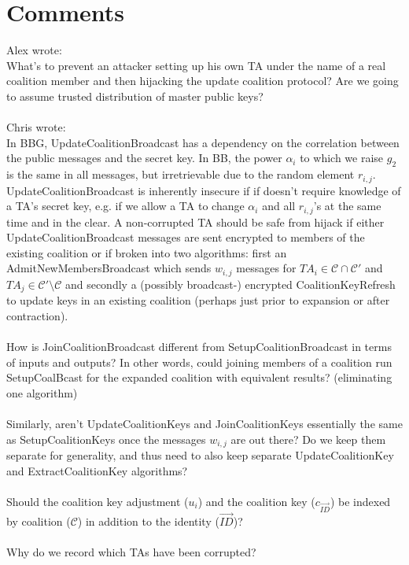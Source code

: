 \documentclass[10pt]{llncs}
\newcommand{\C}{\mathcal{C}}
\newcommand{\ID}{\mathit{ID}}
\newcommand{\TA}{\mathit{TA}}
\begin{document}
\section{Comments}
	Alex wrote:\\
	What's to prevent an attacker setting up his own TA under the name of a real coalition member and then hijacking the update coalition protocol? Are we going to assume trusted distribution of master public keys?\\\\
	Chris wrote:\\
	In BBG, UpdateCoalitionBroadcast has a dependency on the correlation between the public messages and the secret key.  In BB, the power $\alpha_i$ to which we raise $g_2$ is the same in all messages, but irretrievable due to the random element $r_{i,j}$.  UpdateCoalitionBroadcast is inherently insecure if if doesn't require knowledge of a TA's secret key, e.g. if we allow a TA to change $\alpha_i$ and all $r_{i,j}$'s at the same time and in the clear.  A non-corrupted TA should be safe from hijack if either UpdateCoalitionBroadcast messages are sent encrypted to members of the existing coalition or if broken into two algorithms: first an AdmitNewMembersBroadcast which sends $w_{i,j}$ messages for  $\TA_i \in \C \cap \C'$ and $\TA_j \in \C' \setminus \C$ and secondly a (possibly broadcast-) encrypted CoalitionKeyRefresh to update keys in an existing coalition (perhaps just prior to expansion or after contraction).\\\\
	How is JoinCoalitionBroadcast different from SetupCoalitionBroadcast in terms of inputs and outputs?  In other words, could joining members of a coalition run SetupCoalBcast for the expanded coalition with equivalent results? (eliminating one algorithm)\\\\
	Similarly, aren't UpdateCoalitionKeys and JoinCoalitionKeys essentially the same as SetupCoalitionKeys once the messages $w_{i,j}$ are out there? Do we keep them separate for generality, and thus need to also keep separate UpdateCoalitionKey and ExtractCoalitionKey algorithms?\\\\
	Should the coalition key adjustment ($u_i$) and the coalition key ($c_{\vec{\ID}}$) be indexed by coalition ($\C$) in addition to the identity ($\vec{\ID}$)?\\\\
	Why do we record which TAs have been corrupted?
	
\end{document}

